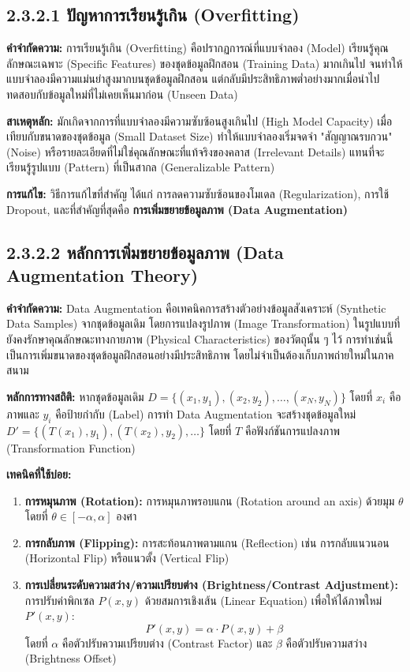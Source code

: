\documentclass[11pt,a4paper,openany]{report}
\begin{document}
\subsection{2.3.2.1 ปัญหาการเรียนรู้เกิน (Overfitting)}


\textbf{คำจำกัดความ:} การเรียนรู้เกิน (Overfitting) คือปรากฏการณ์ที่แบบจำลอง (Model) เรียนรู้คุณลักษณะเฉพาะ (Specific Features) ของชุดข้อมูลฝึกสอน (Training Data) มากเกินไป จนทำให้แบบจำลองมีความแม่นยำสูงมากบนชุดข้อมูลฝึกสอน แต่กลับมีประสิทธิภาพต่ำอย่างมากเมื่อนำไปทดสอบกับข้อมูลใหม่ที่ไม่เคยเห็นมาก่อน (Unseen Data)

\textbf{สาเหตุหลัก:} มักเกิดจากการที่แบบจำลองมีความซับซ้อนสูงเกินไป (High Model Capacity) เมื่อเทียบกับขนาดของชุดข้อมูล (Small Dataset Size) ทำให้แบบจำลองเริ่มจดจำ "สัญญาณรบกวน" (Noise) หรือรายละเอียดที่ไม่ใช่คุณลักษณะที่แท้จริงของคลาส (Irrelevant Details) แทนที่จะเรียนรู้รูปแบบ (Pattern) ที่เป็นสากล (Generalizable Pattern)

\textbf{การแก้ไข:} วิธีการแก้ไขที่สำคัญ ได้แก่ การลดความซับซ้อนของโมเดล (Regularization), การใช้ Dropout, และที่สำคัญที่สุดคือ \textbf{การเพิ่มขยายข้อมูลภาพ (Data Augmentation)}

\subsection{2.3.2.2 หลักการเพิ่มขยายข้อมูลภาพ (Data Augmentation Theory)}


\textbf{คำจำกัดความ:} Data Augmentation คือเทคนิคการสร้างตัวอย่างข้อมูลสังเคราะห์ (Synthetic Data Samples) จากชุดข้อมูลเดิม โดยการแปลงรูปภาพ (Image Transformation) ในรูปแบบที่ยังคงรักษาคุณลักษณะทางกายภาพ (Physical Characteristics) ของวัตถุนั้น ๆ ไว้ การทำเช่นนี้เป็นการเพิ่มขนาดของชุดข้อมูลฝึกสอนอย่างมีประสิทธิภาพ โดยไม่จำเป็นต้องเก็บภาพถ่ายใหม่ในภาคสนาม

\textbf{หลักการทางสถิติ:} หากชุดข้อมูลเดิม $D = \{(x_1, y_1), (x_2, y_2), \dots, (x_N, y_N)\}$ โดยที่ $x_i$ คือภาพและ $y_i$ คือป้ายกำกับ (Label) การทำ Data Augmentation จะสร้างชุดข้อมูลใหม่ $D' = \{(T(x_1), y_1), (T(x_2), y_2), \dots\}$ โดยที่ $T$ คือฟังก์ชันการแปลงภาพ (Transformation Function)

\textbf{เทคนิคที่ใช้บ่อย:}

\begin{enumerate}
  \item \textbf{การหมุนภาพ (Rotation):} การหมุนภาพรอบแกน (Rotation around an axis) ด้วยมุม $\theta$ โดยที่ $\theta \in [-\alpha, \alpha]$ องศา
  \item \textbf{การกลับภาพ (Flipping):} การสะท้อนภาพตามแกน (Reflection) เช่น การกลับแนวนอน (Horizontal Flip) หรือแนวตั้ง (Vertical Flip)
  \item \textbf{การเปลี่ยนระดับความสว่าง/ความเปรียบต่าง (Brightness/Contrast Adjustment):} การปรับค่าพิกเซล $P(x, y)$ ด้วยสมการเชิงเส้น (Linear Equation) เพื่อให้ได้ภาพใหม่ $P'(x, y)$:
  $$P'(x, y) = \alpha \cdot P(x, y) + \beta$$
  โดยที่ $\alpha$ คือตัวปรับความเปรียบต่าง (Contrast Factor) และ $\beta$ คือตัวปรับความสว่าง (Brightness Offset)
\end{enumerate}
\end{document}
